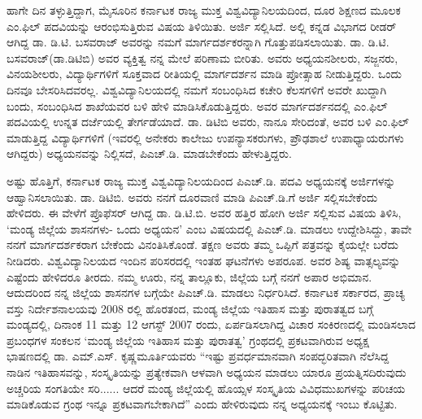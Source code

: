 ಹಾಗೇ ದಿನ ತಳ್ಳುತ್ತಿದ್ದಾಗ, ಮೈಸೂರಿನ ಕರ್ನಾಟಕ ರಾಜ್ಯ ಮುಕ್ತ ವಿಶ್ವವಿದ್ಯಾನಿಲಯದಿಂದ, ದೂರ ಶಿಕ್ಷಣದ ಮೂಲಕ ಎಂ.ಫಿಲ್​ ಪದವಿಯನ್ನು ಆರಂಭಿಸುತ್ತಿರುವ ವಿಷಯ ತಿಳಿಯಿತು. ಅರ್ಜಿ ಸಲ್ಲಿಸಿದೆ. ಅಲ್ಲಿ ಕನ್ನಡ ವಿಭಾಗದ ರೀಡರ್​ ಆಗಿದ್ದ ಡಾ. ಡಿ.ಟಿ. ಬಸವರಾಜ್​ ಅವರನ್ನು ನಮಗೆ ಮಾರ್ಗದರ್ಶಕರನ್ನಾಗಿ ಗೊತ್ತುಪಡಿಸಲಾಯಿತು. ಡಾ. ಡಿ.ಟಿ. ಬಸವರಾಜ್​(ಡಾ.ಡಿಟಿಬಿ) ಅವರ ವ್ಯಕ್ತಿತ್ವ ನನ್ನ ಮೇಲೆ ಪರಿಣಾಮ ಬೀರಿತು. ಅವರು ಅಧ್ಯಯನಶೀಲರು, ಸಜ್ಜನರು, ವಿನಯಶೀಲರು, ವಿದ್ಯಾರ್ಥಿಗಳಿಗೆ ಸೂಕ್ತವಾದ ರೀತಿಯಲ್ಲಿ ಮಾರ್ಗದರ್ಶನ ಮಾಡಿ ಪ್ರೋತ್ಸಾಹ ನೀಡುತ್ತಿದ್ದರು. ಒಂದು ದಿನವೂ ಬೇಸರಿಸಿದವರಲ್ಲ. ವಿಶ್ವವಿದ್ಯಾನಿಲಯದಲ್ಲಿ ನಮಗೆ ಸಂಬಂಧಿಸಿದ ಕಚೇರಿ ಕೆಲಸಗಳಿಗೆ ಅವರೇ ಖುದ್ದಾಗಿ ಬಂದು, ಸಂಬಂಧಿಸಿದ ಶಾಖೆಯವರ ಬಳಿ ಹೇಳಿ ಮಾಡಿಸಿಕೊಡುತ್ತಿದ್ದರು. ಅವರ ಮಾರ್ಗದರ್ಶನದಲ್ಲಿ ಎಂ.ಫಿಲ್​ ಪದವಿಯಲ್ಲಿ ಉನ್ನತ ದರ್ಜೆಯಲ್ಲಿ ತೇರ್ಗಡೆಯಾದೆ. ಡಾ. ಡಿಟಿಬಿ ಅವರು, ನಾನೂ ಸೇರಿದಂತೆ, ಅವರ ಬಳಿ ಎಂ.ಫಿಲ್​ ಮಾಡುತ್ತಿದ್ದ ವಿದ್ಯಾರ್ಥಿಗಳಿಗೆ (ಇವರಲ್ಲಿ ಅನೇಕರು ಕಾಲೇಜು ಉಪನ್ಯಾಸಕರುಗಳು, ಪ್ರೌಢಶಾಲೆ ಉಪಾಧ್ಯಾಯರುಗಳು ಆಗಿದ್ದರು) ಅಧ್ಯಯನವನ್ನು ನಿಲ್ಲಿಸದೆ, ಪಿಎಚ್​.ಡಿ. ಮಾಡಬೇಕೆಂದು ಹೇಳುತ್ತಿದ್ದರು.

ಅಷ್ಟು ಹೊತ್ತಿಗೆ, ಕರ್ನಾಟಕ ರಾಜ್ಯ ಮುಕ್ತ ವಿಶ್ವವಿದ್ಯಾನಿಲಯದಿಂದ ಪಿಎಚ್​.ಡಿ. ಪದವಿ ಅಧ್ಯಯನಕ್ಕೆ ಅರ್ಜಿಗಳನ್ನು ಆಹ್ವಾನಿಸಲಾಯಿತು. ಡಾ. ಡಿಟಿಬಿ. ಅವರು ನನಗೆ ದೂರವಾಣಿ ಮಾಡಿ ಪಿಎಚ್​.ಡಿ.ಗೆ ಅರ್ಜಿ ಸಲ್ಲಿಸಬೇಕೆಂದು ಹೇಳಿದರು. ಈ ವೇಳೆಗೆ ಪ್ರೊಫೆಸರ್​ ಆಗಿದ್ದ ಡಾ. ಡಿ.ಟಿ.ಬಿ. ಅವರ ಹತ್ತಿರ ಹೋಗಿ ಅರ್ಜಿ ಸಲ್ಲಿಸುವ ವಿಷಯ ತಿಳಿಸಿ, ‘ಮಂಡ್ಯ ಜಿಲ್ಲೆಯ ಶಾಸನಗಳು- ಒಂದು ಅಧ್ಯಯನ’ ಎಂಬ ವಿಷಯದಲ್ಲಿ ಪಿಎಚ್​.ಡಿ. ಮಾಡಲು ಉದ್ದೇಶಿಸಿದ್ದು, ತಾವೇ ನನಗೆ ಮಾರ್ಗದರ್ಶಕರಾಗ ಬೇಕೆಂದು ವಿನಂತಿಸಿಕೊಂಡೆ. ತಕ್ಷಣ ಅವರು ತಮ್ಮ ಒಪ್ಪಿಗೆ ಪತ್ರವನ್ನು ಕೈಯಲ್ಲೇ ಬರೆದು ನೀಡಿದರು. ವಿಶ್ವವಿದ್ಯಾನಿಲಯದ ಇಂದಿನ ಪರಿಸರದಲ್ಲಿ ಇಂತಹ ಘಟನೆಗಳು ಅಪರೂಪ. ಅವರ ಶಿಷ್ಯ ವಾತ್ಸಲ್ಯವನ್ನು ಎಷ್ಟೆಂದು ಹೇಳಿದರೂ ತೀರದು. ನಮ್ಮ ಊರು, ನನ್ನ ತಾಲ್ಲೂಕು, ಜಿಲ್ಲೆಯ ಬಗ್ಗೆ ನನಗೆ ಅಪಾರ ಅಭಿಮಾನ. ಆದುದರಿಂದ ನನ್ನ ಜಿಲ್ಲೆಯ ಶಾಸನಗಳ ಬಗ್ಗೆಯೇ ಪಿಎಚ್​.ಡಿ. ಮಾಡಲು ನಿರ್ಧರಿಸಿದೆ. ಕರ್ನಾಟಕ ಸರ್ಕಾರದ, ಪ್ರಾಚ್ಯ ವಸ್ತು ನಿರ್ದೇಶನಾಲಯವು 2008 ರಲ್ಲಿ ಹೊರತಂದ, ಮಂಡ್ಯ ಜಿಲ್ಲೆಯ ಇತಿಹಾಸ ಮತ್ತು ಪುರಾತತ್ವದ ಬಗ್ಗೆ ಮಂಡ್ಯದಲ್ಲಿ, ದಿನಾಂಕ 11 ಮತ್ತು 12 ಆಗಸ್ಟ್​ 2007 ರಂದು, ಏರ್ಪಡಿಸಲಾಗಿದ್ದ ವಿಚಾರ ಸಂಕಿರಣದಲ್ಲಿ ಮಂಡಿಸಲಾದ ಪ್ರಬಂಧಗಳ ಸಂಕಲನ ‘ಮಂಡ್ಯ ಜಿಲ್ಲೆಯ ಇತಿಹಾಸ ಮತ್ತು ಪುರಾತತ್ವ’ ಗ್ರಂಥದಲ್ಲಿ ಪ್ರಕಟವಾಗಿರುವ ಅಧ್ಯಕ್ಷ ಭಾಷಣದಲ್ಲಿ ಡಾ. ಎಮ್.ಎಸ್​. ಕೃಷ್ಣಮೂರ್ತಿಯವರು “ಇಷ್ಟು ಪ್ರವರ್ಧಮಾನವಾಗಿ ಸಂಪದ್ಭರಿತವಾಗಿ ನೆಲೆಸಿದ್ದ ನಾಡಿನ ಇತಿಹಾಸವನ್ನು, ಸಂಸ್ಕೃತಿಯನ್ನು ಪ್ರತ್ಯೇಕವಾಗಿ ಆಳವಾಗಿ ಅಧ್ಯಯನ ಮಾಡಲು ಯಾರೂ ಪ್ರಯತ್ನಿಸದಿರುವುದು ಅಚ್ಚರಿಯ ಸಂಗತಿಯೇ ಸರಿ...... ಆದರೆ ಮಂಡ್ಯ ಜಿಲ್ಲೆಯಲ್ಲಿ ಹೊಯ್ಸಳ ಸಂಸ್ಕೃತಿಯ ವಿವಿಧಮುಖಗಳನ್ನು ಪರಿಚಯ ಮಾಡಿಕೊಡುವ ಗ್ರಂಥ ಇನ್ನೂ ಪ್ರಕಟವಾಗಬೇಕಾಗಿದೆ” ಎಂದು ಹೇಳಿರುವುದು ನನ್ನ ಅಧ್ಯಯನಕ್ಕೆ ಇಂಬು ಕೊಟ್ಟಿತು. 

